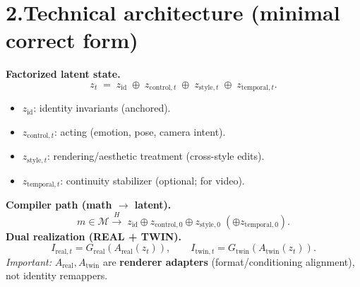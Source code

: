 \documentclass[10pt]{article}
\newcommand{\cM}{\mathcal{M}}
\begin{document}
\section*{2.\;Technical architecture (minimal correct form)}
\vspace{-0.25em}
\noindent\textbf{Factorized latent state.}
\[
z_t \;=\; z_{\mathrm{id}} \;\oplus\; z_{\mathrm{control},t} \;\oplus\; z_{\mathrm{style},t} \;\oplus\; z_{\mathrm{temporal},t}.
\]
\vspace{-0.4em}
\begin{itemize}[leftmargin=1.2em,itemsep=0.15em,topsep=0.2em]
\item $z_{\mathrm{id}}$: identity invariants (anchored).
\item $z_{\mathrm{control},t}$: acting (emotion, pose, camera intent).
\item $z_{\mathrm{style},t}$: rendering/aesthetic treatment (cross-style edits).
\item $z_{\mathrm{temporal},t}$: continuity stabilizer (optional; for video).
\end{itemize}
\noindent\textbf{Compiler path (math $\to$ latent).}
\[
m\in\cM \xrightarrow{H}\; z_{\mathrm{id}} \oplus z_{\mathrm{control},0} \oplus z_{\mathrm{style},0}\;(\oplus z_{\mathrm{temporal},0}).
\]
\noindent\textbf{Dual realization (REAL + TWIN).}
\[
I_{\text{real},t}=G_{\text{real}}(A_{\text{real}}(z_t)),
\qquad
I_{\text{twin},t}=G_{\text{twin}}(A_{\text{twin}}(z_t)).
\]
\noindent\emph{Important:} $A_{\text{real}},A_{\text{twin}}$ are \textbf{renderer adapters} (format/conditioning alignment), not identity remappers.
\end{document}

